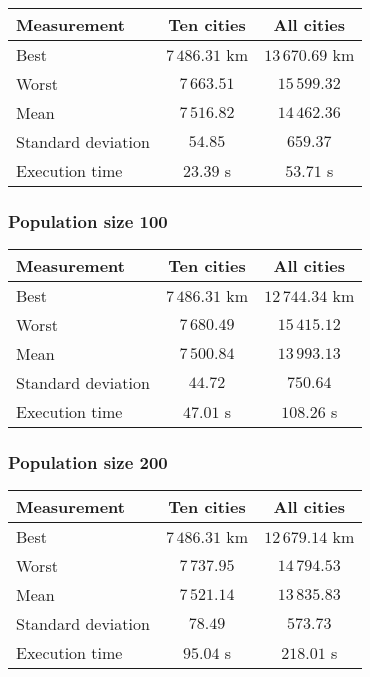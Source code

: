 \documentclass{article}
\begin{document}
\begin{center}
\begin{tabular}{lcc}
\toprule
Measurement & Ten cities & All cities \\
\midrule
Best & $7\,486.31$ km & $13\,670.69$ km \\
Worst & $7\,663.51$ & $15\,599.32$ \\
Mean & $7\,516.82$ & $14\,462.36$ \\
Standard deviation & $54.85$ & $659.37$ \\
Execution time & $23.39$ s & $53.71$ s \\
\bottomrule
\end{tabular}
\end{center}

\subsubsection*{Population size 100}

\begin{center}
\begin{tabular}{lcc}
\toprule
Measurement & Ten cities & All cities \\
\midrule
Best & $7\,486.31$ km & $12\,744.34$ km \\
Worst & $7\,680.49$ & $15\,415.12$ \\
Mean & $7\,500.84$ & $13\,993.13$ \\
Standard deviation & $44.72$ & $750.64$ \\
Execution time & $47.01$ s & $108.26$ s \\
\bottomrule
\end{tabular}
\end{center}

\subsubsection*{Population size 200}

\begin{center}
\begin{tabular}{lcc}
\toprule
Measurement & Ten cities & All cities \\
\midrule
Best & $7\,486.31$ km & $12\,679.14$ km \\
Worst & $7\,737.95$ & $14\,794.53$ \\
Mean & $7\,521.14$ & $13\,835.83$ \\
Standard deviation & $78.49$ & $573.73$ \\
Execution time & $95.04$ s & $218.01$ s \\
\bottomrule
\end{tabular}
\end{center}
\end{document}
